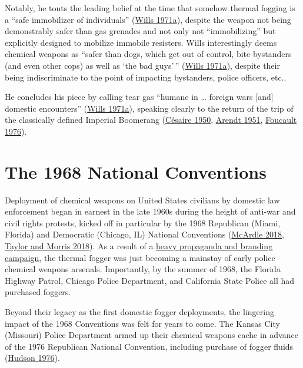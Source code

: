 \documentclass[
  11pt,
]{krantz}
\begin{document}
Notably, he touts the leading belief at the time that somehow thermal fogging is a ``safe immobilizer of individuals'' (\protect\hyperlink{ref-Wills1971a}{Wills 1971a}), despite the weapon not being demonstrably safer than gas grenades and not only not ``immobilizing'' but explicitly designed to mobilize immobile resisters.
Wills interestingly deems chemical weapons as ``safer than dogs, which get out of control, bite bystanders (and even other cops) as well as `the bad guys'\,'' (\protect\hyperlink{ref-Wills1971a}{Wills 1971a}), despite their being indiscriminate to the point of impacting bystanders, police officers, etc..

He concludes his piece by calling tear gas ``humane in \ldots{} foreign wars {[}and{]} domestic encounters'' (\protect\hyperlink{ref-Wills1971a}{Wills 1971a}), speaking clearly to the return of the trip of the classically defined Imperial Boomerang (\protect\hyperlink{ref-Cesaire1950}{Césaire 1950}, \protect\hyperlink{ref-Arendt1951}{Arendt 1951}, \protect\hyperlink{ref-Foucault1976}{Foucault 1976}).

\hypertarget{The1968Conventions}{%
\chapter{The 1968 National Conventions}\label{The1968Conventions}}

Deployment of chemical weapons on United States civilians by domestic law enforcement began in earnest in the late 1960s during the height of anti-war and civil rights protests, kicked off in particular by the 1968 Republican (Miami, Florida) and Democratic (Chicago, IL) National Conventions (\protect\hyperlink{ref-McArdle2018}{McArdle 2018}, \protect\hyperlink{ref-TaylorandMorris2018}{Taylor and Morris 2018}).
As a result of a \protect\hyperlink{TheReturn}{heavy propaganda and branding campaign}, the thermal fogger was just becoming a mainstay of early police chemical weapons arsenals.
Importantly, by the summer of 1968, the Florida Highway Patrol, Chicago Police Department, and California State Police all had purchased foggers.

Beyond their legacy as the first domestic fogger deployments, the lingering impact of the 1968 Conventions was felt for years to come.
The Kansas City (Missouri) Police Department armed up their chemical weapons cache in advance of the 1976 Republican National Convention, including purchase of fogger fluids (\protect\hyperlink{ref-Hudson1976}{Hudson 1976}).
\end{document}
